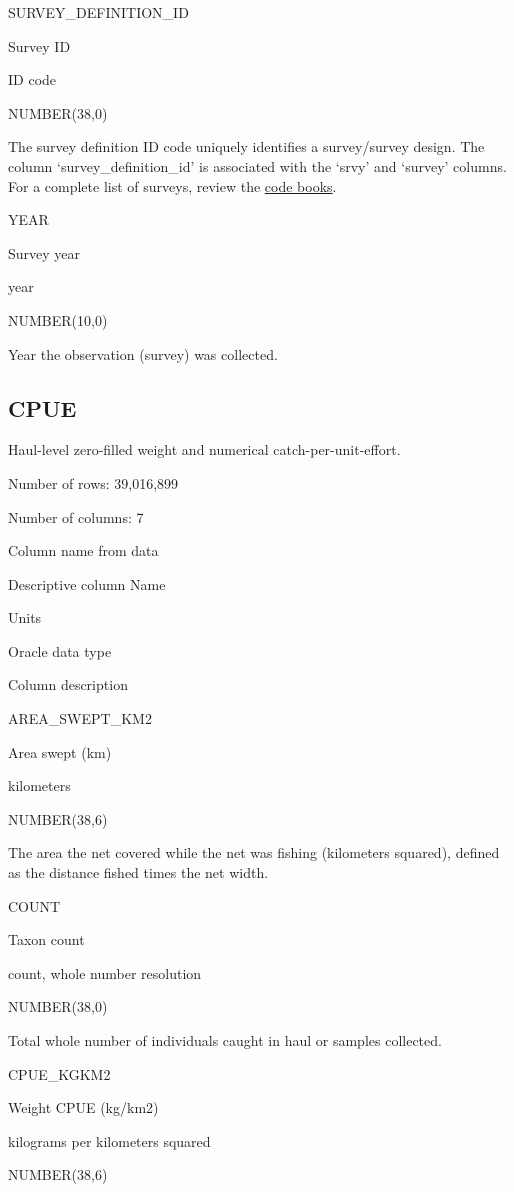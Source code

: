 \documentclass[
  letterpaper,
  oneside,
  open=any]{scrbook}
\begin{document}
SURVEY\_DEFINITION\_ID

Survey ID

ID code

NUMBER(38,0)

The survey definition ID code uniquely identifies a survey/survey
design. The column `survey\_definition\_id' is associated with the
`srvy' and `survey' columns. For a complete list of surveys, review the
\href{https://www.fisheries.noaa.gov/resource/document/groundfish-survey-species-code-manual-and-data-codes-manual}{code
books}.

YEAR

Survey year

year

NUMBER(10,0)

Year the observation (survey) was collected.

\hypertarget{cpue}{%
\subsection{CPUE}\label{cpue}}

Haul-level zero-filled weight and numerical catch-per-unit-effort.

Number of rows: 39,016,899

Number of columns: 7

Column name from data

Descriptive column Name

Units

Oracle data type

Column description

AREA\_SWEPT\_KM2

Area swept (km)

kilometers

NUMBER(38,6)

The area the net covered while the net was fishing (kilometers squared),
defined as the distance fished times the net width.

COUNT

Taxon count

count, whole number resolution

NUMBER(38,0)

Total whole number of individuals caught in haul or samples collected.

CPUE\_KGKM2

Weight CPUE (kg/km2)

kilograms per kilometers squared

NUMBER(38,6)
\end{document}
